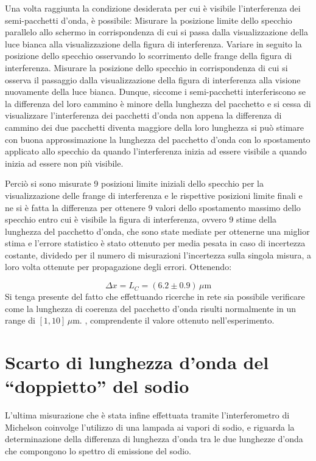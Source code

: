 \documentclass[a4paper,12pt]{article}
\begin{document}
Una volta raggiunta la condizione desiderata per cui è visibile l’interferenza dei semi-pacchetti d’onda, è possibile: 
Misurare la posizione limite dello specchio parallelo allo schermo in corrispondenza di cui si passa dalla visualizzazione della luce bianca alla visualizzazione della figura di interferenza. 
Variare in seguito la posizione dello specchio osservando lo scorrimento delle frange della figura di interferenza.
Misurare la posizione dello specchio in corrispondenza di cui si osserva il passaggio dalla visualizzazione della figura di interferenza alla visione nuovamente della luce bianca. 
Dunque, siccome i semi-pacchetti interferiscono se la differenza del loro cammino è minore della lunghezza del pacchetto e si cessa di visualizzare l’interferenza dei pacchetti d’onda non appena la differenza di cammino dei due pacchetti diventa maggiore della loro lunghezza si può stimare con buona approssimazione la lunghezza del pacchetto d’onda con lo spostamento applicato allo specchio da quando l’interferenza inizia ad essere visibile a quando inizia ad essere non più visibile. 

Perciò si sono misurate 9 posizioni limite iniziali dello specchio per la visualizzazione delle frange di interferenza e le rispettive posizioni limite finali e ne si è fatta la differenza per ottenere 9 valori dello spostamento massimo dello specchio entro cui è visibile la figura di interferenza, ovvero 9 stime della lunghezza del pacchetto d’onda, che sono state mediate per ottenerne una miglior stima e l'errore statistico è stato ottenuto per media pesata in caso di incertezza costante, dividedo per il numero di misurazioni l'incertezza sulla singola misura, a loro volta ottenute per propagazione degli errori. 
Ottenendo: 

\begin{equation}
\Delta x = L_C = (6.2 \pm 0.9) \, \mu\text{m}
\label{eq:lunghezza_coerenza}
\end{equation}
Si tenga presente del fatto che effettuando ricerche in rete sia possibile verificare come la lunghezza di coerenza del pacchetto d’onda risulti normalmente in un range di 
\([1, 10] \, \mu\text{m}.\) , comprendente il valore ottenuto nell’esperimento. 
 
\section{Scarto di lunghezza d’onda del “doppietto” del sodio}

L’ultima misurazione che è stata infine effettuata tramite l’interferometro di Michelson coinvolge l’utilizzo di una lampada ai vapori di sodio, e riguarda la determinazione della differenza di lunghezza d’onda tra le due lunghezze d’onda che compongono lo spettro di emissione del sodio.
\end{document}
